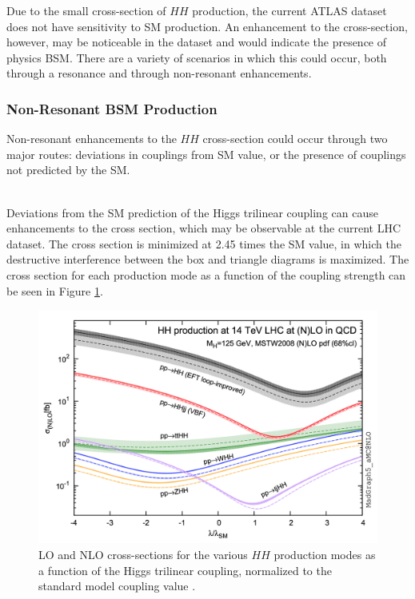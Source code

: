 Due to the small cross-section of $HH$ production, the current ATLAS dataset does not have sensitivity to \gls{SM} production. An enhancement to the cross-section, however, may be noticeable in the dataset and would indicate the presence of physics \gls{BSM}. There are a variety of scenarios in which this could occur, both through a resonance and through non-resonant enhancements.

\subsubsection{Non-Resonant BSM Production}

Non-resonant enhancements to the $HH$ cross-section could occur through two major routes: deviations in couplings from \gls{SM} value, or the presence of couplings not predicted by the \gls{SM}.

\noindent{${\boldsymbol \kappa_{\lambda}}$}\\
\indent Deviations from the \gls{SM} prediction of the Higgs trilinear coupling can cause enhancements to the cross section, which may be observable at the current \gls{LHC} dataset. The cross section is minimized at 2.45 times the \gls{SM} value, in which the destructive interference between the box and triangle diagrams is maximized. The cross section for each production mode as a function of the coupling strength can be seen in Figure \ref{fig:klambda-xsec}.

\begin{figure}[!ht]
    \centering
    \includegraphics[width=.7\textwidth]{chapters/chapter1_theory/images/klambda-xsec.png}
    \caption[LO and NLO cross-sections for the various $HH$ production modes as a function of the Higgs trilinear coupling]{LO and NLO cross-sections for the various $HH$ production modes as a function of the Higgs trilinear coupling, normalized to the standard model coupling value \cite{klambda-xsec}.}
    \label{fig:klambda-xsec}
\end{figure}

